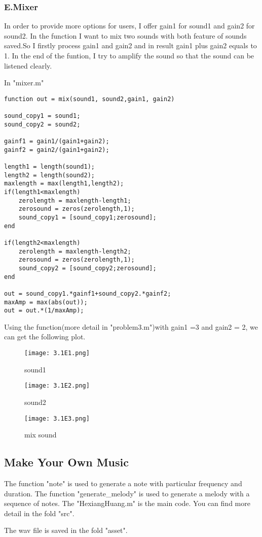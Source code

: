 \documentclass{article}
\begin{document}
\subsubsection*{E.Mixer}
In order to provide more options for users,
I offer gain1 for sound1 and gain2 for sound2.
In the function I want to mix two sounds with 
both feature of sounds saved.So I firstly process 
gain1 and gain2 and in result gain1 plus gain2 equals to 1. 
In the end of the funtion, I try to amplify the sound 
so that the sound can be listened clearly.\par
In "mixer.m"\par
\begin{lstlisting} 
function out = mix(sound1, sound2,gain1, gain2)

sound_copy1 = sound1;
sound_copy2 = sound2;

gainf1 = gain1/(gain1+gain2);
gainf2 = gain2/(gain1+gain2);

length1 = length(sound1);
length2 = length(sound2);
maxlength = max(length1,length2);
if(length1<maxlength)
    zerolength = maxlength-length1;
    zerosound = zeros(zerolength,1);
    sound_copy1 = [sound_copy1;zerosound];
end

if(length2<maxlength)
    zerolength = maxlength-length2;
    zerosound = zeros(zerolength,1);
    sound_copy2 = [sound_copy2;zerosound];
end

out = sound_copy1.*gainf1+sound_copy2.*gainf2;
maxAmp = max(abs(out));
out = out.*(1/maxAmp);
\end{lstlisting}
\newpage
Using the function(more detail in "problem3.m")with gain1 =3 and gain2 = 2,
we can get the following plot.\par
\begin{figure}[h]
    \begin{minipage}{1.0\textwidth}
        \centering
        \texttt{[image: 3.1E1.png]}
        \caption{sound1}
    \end{minipage}

    \quad

    \begin{minipage}{1.0\textwidth}
        \centering
        \texttt{[image: 3.1E2.png]}
        \caption{sound2}
    \end{minipage}

    \quad

    \begin{minipage}{1.0\textwidth}
        \centering
        \texttt{[image: 3.1E3.png]}
        \caption{mix sound}
    \end{minipage}
\end{figure}

\subsection{Make Your Own Music}

The function "note" is used to generate a note with particular frequency and duration.
The function "generate\_melody" is used to generate a melody with a sequence of notes.
The "HexiangHuang.m" is the main code.
You can find more detail in the fold "src".\par
The wav file is saved in the fold "asset".\par
\end{document}
